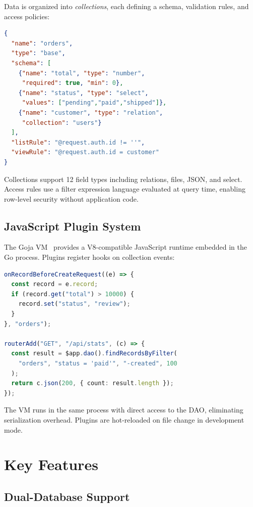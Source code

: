 \documentclass[11pt,twocolumn]{article}
\begin{document}
Data is organized into \emph{collections}, each defining a schema, validation rules, and access policies:

\begin{lstlisting}[language=JSON]
{
  "name": "orders",
  "type": "base",
  "schema": [
    {"name": "total", "type": "number",
     "required": true, "min": 0},
    {"name": "status", "type": "select",
     "values": ["pending","paid","shipped"]},
    {"name": "customer", "type": "relation",
     "collection": "users"}
  ],
  "listRule": "@request.auth.id != ''",
  "viewRule": "@request.auth.id = customer"
}
\end{lstlisting}

Collections support 12 field types including relations, files, JSON, and select. Access rules use a filter expression language evaluated at query time, enabling row-level security without application code.

\subsection{JavaScript Plugin System}

The Goja VM~\cite{goja2020} provides a V8-compatible JavaScript runtime embedded in the Go process. Plugins register hooks on collection events:

\begin{lstlisting}[language=TypeScript]
onRecordBeforeCreateRequest((e) => {
  const record = e.record;
  if (record.get("total") > 10000) {
    record.set("status", "review");
  }
}, "orders");

routerAdd("GET", "/api/stats", (c) => {
  const result = $app.dao().findRecordsByFilter(
    "orders", "status = 'paid'", "-created", 100
  );
  return c.json(200, { count: result.length });
});
\end{lstlisting}

The VM runs in the same process with direct access to the DAO, eliminating serialization overhead. Plugins are hot-reloaded on file change in development mode.

\section{Key Features}

\subsection{Dual-Database Support}
\end{document}
